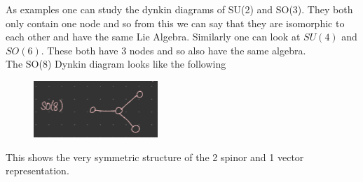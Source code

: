 \documentclass[a4paper,12pt]{article}
\begin{document}
As examples one can study the dynkin diagrams of SU(2) and SO(3). They both only contain one node and so from this we can say that they are isomorphic to each other and have the same Lie Algebra. Similarly one can look at $SU(4)$ and $SO(6)$. These both have 3 nodes and so also have the same algebra.\\
The SO(8) Dynkin diagram looks like the following
\begin{figure}[H]
	\centering
	\includegraphics[width=0.4\linewidth]{31}
\end{figure} 
This shows the very symmetric structure of the 2 spinor and 1 vector representation.\\
\end{document}
